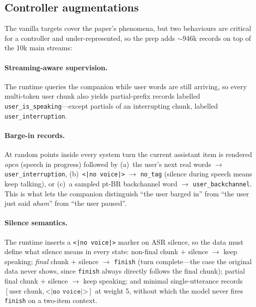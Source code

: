\documentclass[conference]{IEEEtran}
\begin{document}
\subsection{Controller augmentations}
The vanilla targets cover the paper's phenomena, but two behaviours are critical
for a controller and under-represented, so the prep adds $\sim$946k records on top
of the 10k main streams:

\paragraph{Streaming-aware supervision.} The runtime queries the companion while
user words are still arriving, so every multi-token user chunk also yields
partial-prefix records labelled \texttt{user\_is\_speaking}---except partials of
an interrupting chunk, labelled \texttt{user\_interruption}.

\paragraph{Barge-in records.} At random points inside every system turn the
current assistant item is rendered \emph{open} (speech in progress) followed by
(a)~the user's next real words $\rightarrow$ \texttt{user\_interruption},
(b)~\texttt{<|no voice|>} $\rightarrow$ \texttt{no\_tag} (silence during speech
means keep talking), or (c)~a sampled pt-BR backchannel word $\rightarrow$
\texttt{user\_backchannel}. This is what lets the companion distinguish ``the user
barged in'' from ``the user just said \emph{aham}'' from ``the user paused''.

\paragraph{Silence semantics.} The runtime inserts a \texttt{<|no voice|>} marker
on ASR silence, so the data must define what silence means in every state:
non-final chunk $+$ silence $\rightarrow$ keep speaking; \emph{final} chunk $+$
silence $\rightarrow$ \texttt{finish} (turn complete---the case the original data
never shows, since \texttt{finish} always directly follows the final chunk);
partial final chunk $+$ silence $\rightarrow$ keep speaking; and minimal
single-utterance records $[\text{user chunk}, \texttt{<|no voice|>}]$ at weight 5,
without which the model never fires \texttt{finish} on a two-item context.
\end{document}
